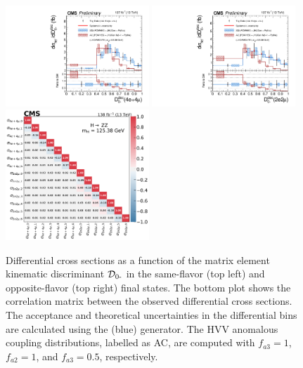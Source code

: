 \begin{center}%
	\begin{figure}[!htb]
		\centering
		\includegraphics[width=0.48\textwidth]{Images/H4L/discriminants/model_v4/D0m_unfoldwith_4l_SM_125_asimov.pdf}
		\includegraphics[width=0.48\textwidth]{Images/H4L/discriminants/model_v4/D0m_unfoldwith_2e2mu_SM_125_asimov.pdf}\\
		\includegraphics[width=0.48\textwidth]{Images/H4L/correlations/corr_D0m_v4.pdf}\\
		\caption{
			Differential cross sections as a function of the matrix element kinematic discriminant ${\mathcal D}_{\text{0-}}$ in the same-flavor (top left) and opposite-flavor (top right)  final states.
			The bottom plot shows the correlation matrix between the observed differential cross sections.
			The acceptance and theoretical uncertainties in the differential bins are calculated using the \POWHEG (blue) generator.
			The HVV anomalous coupling distributions, labelled as AC, are computed with $f_{a3} = 1$, $f_{a2} = 1$, and $f_{a3} = 0.5$, respectively.
			\label{fig:fidDZM}}
	\end{figure}
\end{center}

